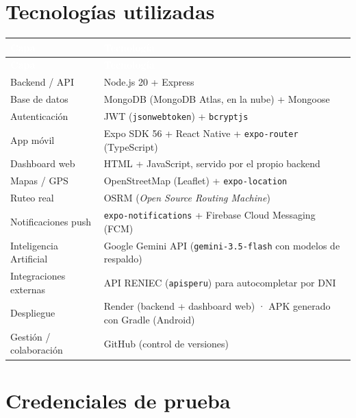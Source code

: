 \documentclass[11pt,a4paper]{article}
\begin{document}
\section{Tecnologías utilizadas}

\begin{longtable}{|p{4cm}|p{10.5cm}|}
\hline
\rowcolor{azuloscuro}
\textcolor{white}{\textbf{Capa}} & \textcolor{white}{\textbf{Tecnología}} \\
\hline
\endfirsthead
\hline
\rowcolor{azuloscuro}
\textcolor{white}{\textbf{Capa}} & \textcolor{white}{\textbf{Tecnología}} \\
\hline
\endhead
Backend / API & Node.js 20 + Express \\
\hline
Base de datos & MongoDB (MongoDB Atlas, en la nube) + Mongoose \\
\hline
Autenticación & JWT (\texttt{jsonwebtoken}) + \texttt{bcryptjs} \\
\hline
App móvil & Expo SDK 56 + React Native + \texttt{expo-router} (TypeScript) \\
\hline
Dashboard web & HTML + JavaScript, servido por el propio backend \\
\hline
Mapas / GPS & OpenStreetMap (Leaflet) + \texttt{expo-location} \\
\hline
Ruteo real & OSRM (\textit{Open Source Routing Machine}) \\
\hline
Notificaciones push & \texttt{expo-notifications} + Firebase Cloud Messaging (FCM) \\
\hline
Inteligencia Artificial & Google Gemini API (\texttt{gemini-3.5-flash} con modelos de respaldo) \\
\hline
Integraciones externas & API RENIEC (\texttt{apisperu}) para autocompletar por DNI \\
\hline
Despliegue & Render (backend + dashboard web) · APK generado con Gradle (Android) \\
\hline
Gestión / colaboración & GitHub (control de versiones) \\
\hline
\end{longtable}

\section{Credenciales de prueba}
\end{document}
